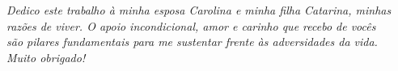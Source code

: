 \begin{dedicatoria}
    \vspace*{\fill}
    \centering
    \noindent
    \textit{ Dedico este trabalho à minha esposa Carolina e minha filha Catarina, minhas \\
    razões de viver. O apoio incondicional, amor e carinho que recebo de vocês \\ 
    são pilares fundamentais para me sustentar frente às adversidades da vida.\\
    Muito obrigado!} \vspace*{\fill}
\end{dedicatoria}
